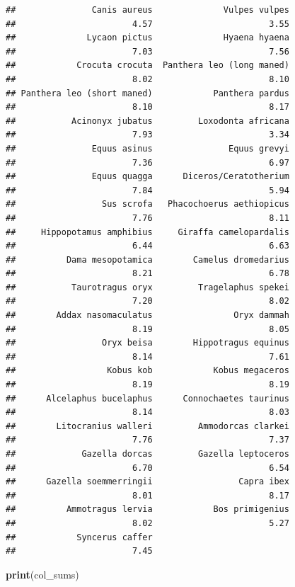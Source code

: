 \documentclass[
]{article}
\newenvironment{Shaded}{\begin{snugshade}}{\end{snugshade}}
\newcommand{\FunctionTok}[1]{\textcolor[rgb]{0.13,0.29,0.53}{\textbf{#1}}}
\newcommand{\NormalTok}[1]{#1}
\begin{document}
\begin{verbatim}
##               Canis aureus              Vulpes vulpes 
##                       4.57                       3.55 
##              Lycaon pictus              Hyaena hyaena 
##                       7.03                       7.56 
##            Crocuta crocuta  Panthera leo (long maned) 
##                       8.02                       8.10 
## Panthera leo (short maned)            Panthera pardus 
##                       8.10                       8.17 
##           Acinonyx jubatus         Loxodonta africana 
##                       7.93                       3.34 
##               Equus asinus               Equus grevyi 
##                       7.36                       6.97 
##               Equus quagga      Diceros/Ceratotherium 
##                       7.84                       5.94 
##                 Sus scrofa   Phacochoerus aethiopicus 
##                       7.76                       8.11 
##     Hippopotamus amphibius     Giraffa camelopardalis 
##                       6.44                       6.63 
##          Dama mesopotamica        Camelus dromedarius 
##                       8.21                       6.78 
##           Taurotragus oryx         Tragelaphus spekei 
##                       7.20                       8.02 
##        Addax nasomaculatus                Oryx dammah 
##                       8.19                       8.05 
##                 Oryx beisa        Hippotragus equinus 
##                       8.14                       7.61 
##                  Kobus kob            Kobus megaceros 
##                       8.19                       8.19 
##      Alcelaphus bucelaphus      Connochaetes taurinus 
##                       8.14                       8.03 
##        Litocranius walleri         Ammodorcas clarkei 
##                       7.76                       7.37 
##             Gazella dorcas         Gazella leptoceros 
##                       6.70                       6.54 
##      Gazella soemmerringii                 Capra ibex 
##                       8.01                       8.17 
##          Ammotragus lervia            Bos primigenius 
##                       8.02                       5.27 
##            Syncerus caffer 
##                       7.45
\end{verbatim}

\begin{Shaded}
\begin{Highlighting}[]
\FunctionTok{print}\NormalTok{(col\_sums)}
\end{Highlighting}
\end{Shaded}
\end{document}

